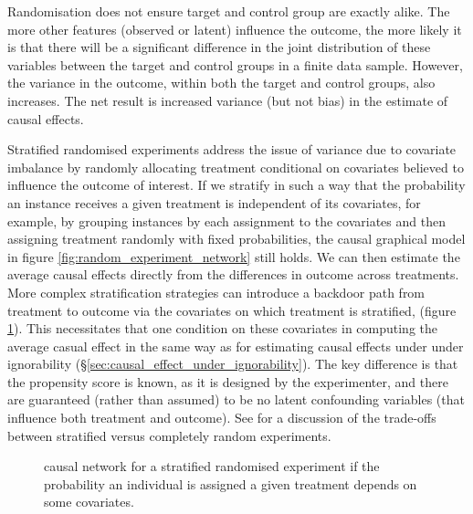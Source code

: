 \documentclass[11pt,a4paper,twoside]{report}
\theoremstyle{plain}
\theoremstyle{definition}
\begin{document}
Randomisation does not ensure target and control group are exactly alike. The more other features (observed or latent) influence the outcome, the more likely it is that there will be a significant difference in the joint distribution of these variables between the target and control groups in a finite data sample. However, the variance in the outcome, within both the target and control groups, also increases. The net result is increased variance (but not bias) in  the estimate of causal effects. 

Stratified randomised experiments address the issue of variance due to covariate imbalance by randomly allocating treatment conditional on covariates believed to influence the outcome of interest. If we stratify in such a way that the probability an instance receives a given treatment is independent of its covariates, for example, by grouping instances by each assignment to the covariates and then assigning treatment randomly with fixed probabilities, the causal graphical model in figure \ref{fig:random_experiment_network} still holds. We can then estimate the average causal effects directly from the differences in outcome across treatments. More complex stratification strategies can introduce a backdoor path from treatment to outcome via the covariates on which treatment is stratified, (figure \ref{fig:random_experiment_network_stratified}). This necessitates that one condition on these covariates in computing the average casual effect in the same way as for estimating causal effects under under ignorability (\S\ref{sec:causal_effect_under_ignorability}). The key difference is that the propensity score is known, as it is designed by the experimenter, and there are guaranteed (rather than assumed) to be no latent confounding variables (that influence both treatment and outcome). See \citet{imbens2015causal} for a discussion of the trade-offs between stratified versus completely random experiments. 

\begin{figure}
\centering
{}
\caption{causal network for a stratified randomised experiment if the probability an individual is assigned a given treatment depends on some covariates.}
\label{fig:random_experiment_network_stratified}
\end{figure} 
\end{document}

